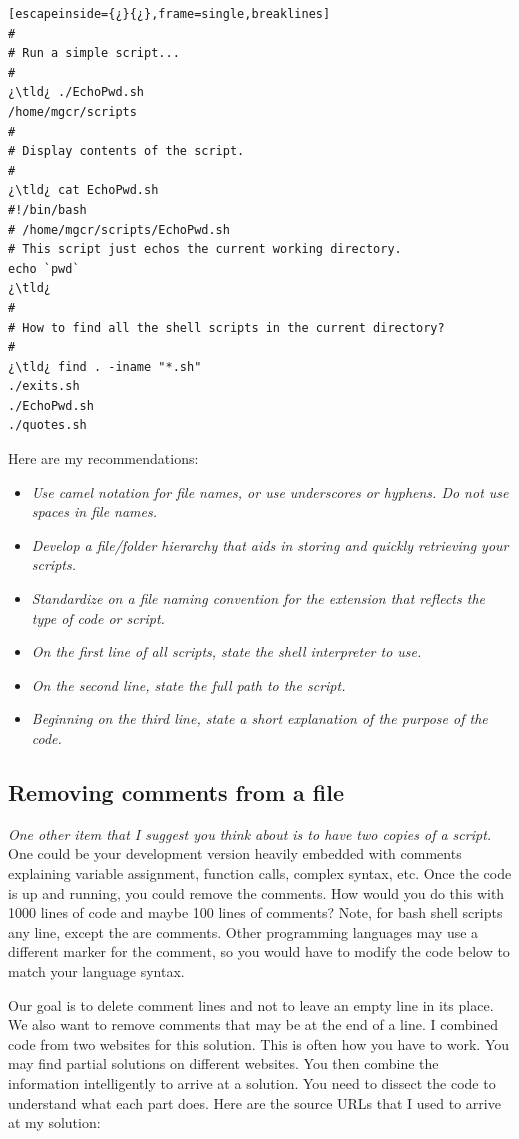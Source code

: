 \begin{lstlisting}[escapeinside={¿}{¿},frame=single,breaklines]
#
# Run a simple script...
#
¿\tld¿ ./EchoPwd.sh
/home/mgcr/scripts
#
# Display contents of the script.
#
¿\tld¿ cat EchoPwd.sh 
#!/bin/bash
# /home/mgcr/scripts/EchoPwd.sh
# This script just echos the current working directory.
echo `pwd`
¿\tld¿
#
# How to find all the shell scripts in the current directory?
#
¿\tld¿ find . -iname "*.sh"
./exits.sh
./EchoPwd.sh
./quotes.sh	
\end{lstlisting}

Here are my recommendations:

\begin{itemize}
	\item \textit{Use camel notation for file names, or use underscores or hyphens. Do not use spaces in file names.}
	\item \textit{Develop a file/folder hierarchy that aids in storing and quickly retrieving your scripts.}
	\item \textit{Standardize on a file naming convention for the extension that reflects the type of code or script.}
	\item \textit{On the first line of all scripts, state the shell interpreter to use. }
	\item \textit{On the second line, state the full path to the script.}
	\item \textit{Beginning on the third line, state a short explanation of the purpose of the code.}
\end{itemize}

\subsection{Removing comments from a file}

\textit{One other item that I suggest you think about is to have two copies of a script.} One could be your development version heavily embedded with comments explaining variable assignment, function calls,  complex syntax, etc. Once the code is up and running, you could remove the comments. How would you do this with 1000 lines of code and maybe 100 lines of comments? Note, for bash shell scripts any line, except the  are comments. Other programming languages may use a different marker for the comment, so you would have to modify the code below to match your language syntax.

Our goal is to delete comment lines and not to leave an empty line in its place. We also want to remove comments that may be at the end of a line. I combined code from two websites for this solution. This is often how you have to work. You may find partial solutions on different websites. You then combine the information intelligently to arrive at a solution. You need to dissect the code to understand what each part does. Here are the source URLs that I used to arrive at my solution:

